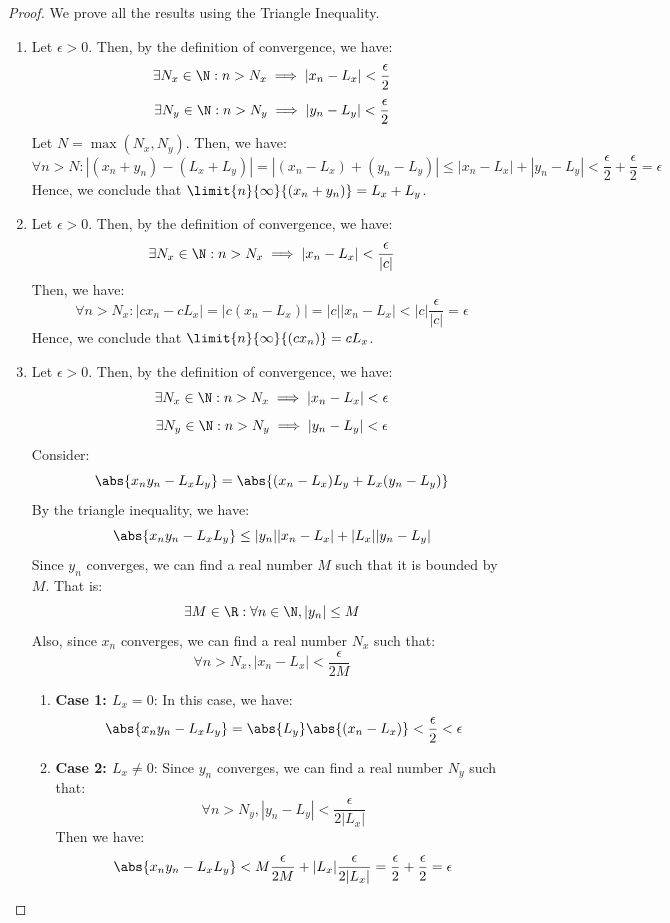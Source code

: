\documentclass[openany]{book}
\begin{document}
\begin{proof}
    We prove all the results using the Triangle Inequality. 
    \begin{enumerate}
    \item Let $\epsilon > 0$. Then, by the definition of convergence, we have:
    $$\exists N_x \in \N: n > N_x \implies |x_n - L_x| < \frac{\epsilon}{2}$$
    $$\exists N_y \in \N: n > N_y \implies |y_n - L_y| < \frac{\epsilon}{2}$$
    Let $N = \max(N_x, N_y)$. Then, we have:
    $$\forall n > N: |(x_n + y_n) - (L_x + L_y)| = |(x_n - L_x) + (y_n - L_y)| \leq |x_n - L_x| + |y_n - L_y| < \frac{\epsilon}{2} + \frac{\epsilon}{2} = \epsilon$$
    Hence, we conclude that $\limit{n}{\infty}{(x_n + y_n)} = L_x + L_y$. \\
    \item Let $\epsilon > 0$. Then, by the definition of convergence, we have:
    $$\exists N_x \in \N: n > N_x \implies |x_n - L_x| < \frac{\epsilon}{|c|}$$
    Then, we have:  
    $$\forall n > N_x: |cx_n - cL_x| = |c(x_n - L_x)| = |c||x_n - L_x| < |c|\frac{\epsilon}{|c|} = \epsilon$$
    Hence, we conclude that $\limit{n}{\infty}{(cx_n)} = c L_x$. \\
    \item Let $\epsilon > 0$. Then, by the definition of convergence, we have:
    $$\exists N_x \in \N: n > N_x \implies |x_n - L_x| < \epsilon$$
    $$\exists N_y \in \N: n > N_y \implies |y_n - L_y| < \epsilon$$
    Consider: 
    $$\abs{x_n y_n - L_x L_y} = \abs{(x_n - L_x)L_y + L_x(y_n - L_y)}$$
    By the triangle inequality, we have:
    $$\abs{x_n y_n - L_x L_y} \leq |y_n||x_n - L_x| + |L_x||y_n - L_y|$$
    Since $y_n$ converges, we can find a real number $M$ such that it is bounded by $M$. That is: 
    $$\exists M \in \R: \forall n \in \N, |y_n| \leq M$$
    Also, since $x_n$ converges, we can find a real number $N_x$ such that:
    $$\forall n > N_x, |x_n - L_x| < \frac{\epsilon}{2M}$$
    \begin{enumerate}
        \item \textbf{Case 1: $L_x = 0$}: In this case, we have:
        $$\abs{x_n y_n - L_x L_y} = \abs{L_y}\abs{(x_n - L_x)} < \frac{\epsilon}{2} < \epsilon$$
        \item \textbf{Case 2: $L_x \neq 0$}: Since $y_n$ converges, we can find a real number $N_y$ such that:
        $$\forall n > N_y, |y_n - L_y| < \frac{\epsilon}{2|L_x|}$$
        Then we have:
        $$\abs{x_n y_n - L_x L_y} < M\frac{\epsilon}{2M} + |L_x|\frac{\epsilon}{2|L_x|} = \frac{\epsilon}{2} + \frac{\epsilon}{2} = \epsilon$$
    \end{enumerate}
    \end{enumerate}
\end{proof}
\end{document}
